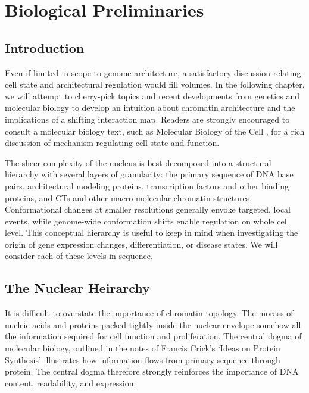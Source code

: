 
\chapter{Biological Preliminaries}

\section*{Introduction}

Even if limited in scope to genome architecture, a satisfactory discussion relating cell state and architectural regulation would fill
volumes.  In the following chapter, we will attempt to cherry-pick topics and recent developments from genetics and molecular biology
to develop an intuition about chromatin architecture and the implications of a shifting interaction map.  Readers are strongly encouraged
to consult a molecular biology text, such as Molecular Biology of the Cell \citep{alberts2002}, for a rich discussion of mechanism
regulating cell state and function.

The sheer complexity of the nucleus is best decomposed into a structural hierarchy with several layers of granularity: the primary
sequence of \gls{DNA} base pairs, architectural modeling proteins, transcription factors and other binding proteins, and \glspl{CT}
and other macro molecular chromatin structures.  Conformational changes at smaller resolutions generally envoke targeted, local events,
while genome-wide conformation shifts enable regulation on whole cell level.  This conceptual hierarchy is useful to keep in mind when
investigating the origin of gene expression changes, differentiation, or disease states.  We will consider each of these levels in sequence.

\section*{The Nuclear Heirarchy}

It is difficult to overstate the importance of chromatin topology.  The morass of nucleic acids and proteins packed tightly inside the
nuclear envelope somehow all the information sequired for cell function and proliferation.  The central dogma of molecular biology,
outlined in the notes of Francis Crick's `Ideas on Protein Synthesis' \citep{crick1970} illustrates how information flows from primary
sequence through protein.  The central dogma therefore strongly reinforces the importance of \gls{DNA} content, readability, and expression.

